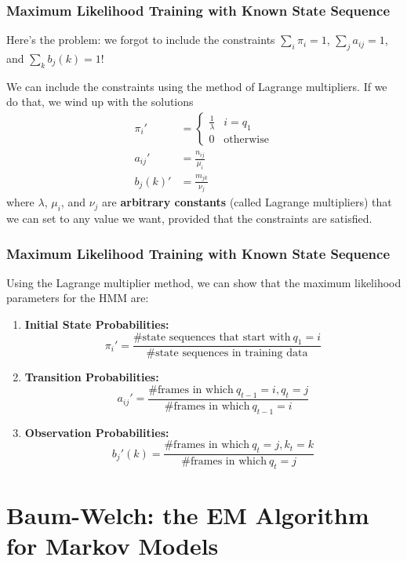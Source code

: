 \documentclass{beamer}
\begin{document}
\begin{frame}
  \frametitle{Maximum Likelihood Training with Known State Sequence}

  Here's the problem: we forgot to include the constraints
  $\sum_i\pi_i=1$, $\sum_j a_{ij}=1$, and $\sum_k b_j(k)=1$!

  We can include the constraints using the method of Lagrange multipliers.  If we do that,
  we wind up with the solutions
  \begin{align*}
    \pi_i' &= \begin{cases}\frac{1}{\lambda} & i=q_1\\0&\mbox{otherwise}\end{cases}\\
    a_{ij}' &= \frac{n_{ij}}{\mu_i}\\
    b_j(k)' &= \frac{m_{jk}}{\nu_j}
  \end{align*}
  where $\lambda$, $\mu_i$, and $\nu_j$ are {\bf arbitrary constants}
  (called Lagrange multipliers) that we can set to any value we want,
  provided that the constraints are satisfied.
\end{frame}

\begin{frame}
  \frametitle{Maximum Likelihood Training with Known State Sequence}

  Using the Lagrange multiplier method, we can show that the maximum likelihood  parameters
  for the HMM are:
  \begin{enumerate}
  \item {\bf Initial State Probabilities:}
    \[
    \pi_i'=\frac{\mbox{\# state sequences that start with}~q_1=i}{\mbox{\# state sequences in training data}}
    \]
  \item {\bf Transition Probabilities:}
    \[
    a_{ij}'=\frac{\mbox{\# frames in which}~q_{t-1}=i,q_t=j}{\mbox{\# frames in which}~q_{t-1}=i}
    \]
  \item {\bf Observation Probabilities:} 
    \[
    b_j'(k)=\frac{\mbox{\# frames in which}~q_t=j,k_t=k}{\mbox{\# frames in which}~q_{t}=j}
    \]
  \end{enumerate}
\end{frame}

  
\section[Baum-Welch]{Baum-Welch: the EM Algorithm for Markov Models}
\setcounter{subsection}{1}
\end{document}
